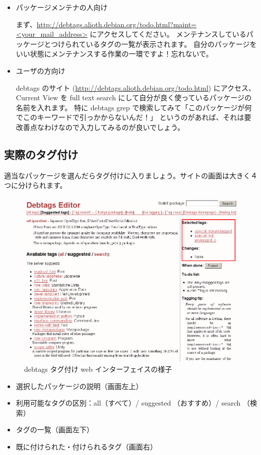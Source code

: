 \documentclass[mingoth,a4paper]{jsarticle}
\begin{document}
\begin{itemize}
  \item パッケージメンテナの人向け

        まず、\url{http://debtags.alioth.debian.org/todo.html?maint=<your_mail_address>} にアクセスしてください。
        メンテナンスしているパッケージとつけられているタグの一覧が表示されます。
        自分のパッケージをいい状態にメンテナンスする作業の一環ですよ！忘れないで。

  \item ユーザの方向け 

         debtags のサイト (\url{http://debtags.alioth.debian.org/todo.html}) にアクセス、
         Current View を full text search にして自分が良く使っているパッケージの名前を入れます。
         特に debtags grep で検索してみて「このパッケージが何でこのキーワードで引っかからないんだ！」
         というのがあれば、それは要改善点なわけなので入力してみるのが良いでしょう。
\end{itemize}

\subsection{実際のタグ付け}

適当なパッケージを選んだらタグ付けに入りましょう。サイトの画面は大きく４つに分けられます。

\begin{figure}[H]
\begin{center}
 \includegraphics[height=0.5\hsize] {image201004/gotagging02.png}
 \caption{debtags タグ付け web インターフェイスの様子}
\label{fig:gotagging02}
\end{center}
\end{figure}

\begin{itemize}
 \item 選択したパッケージの説明（画面左上）
 \item 利用可能なタグの区別：all（すべて）/ suggested （おすすめ）/ search （検索）
 \item タグの一覧（画面左下）
 \item 既に付けられた・付けられるタグ（画面右）
\end{itemize}
\end{document}
